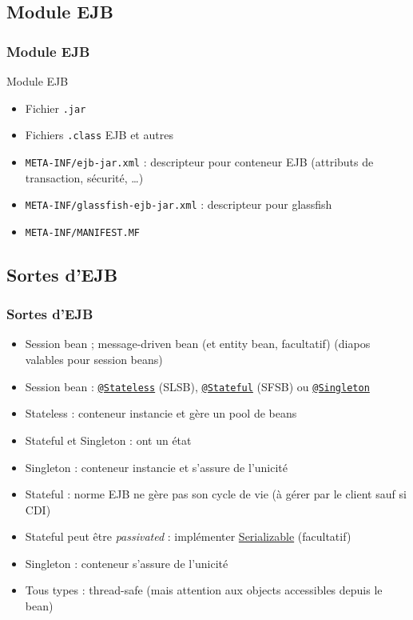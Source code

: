 \documentclass[english, french]{beamer}
\begin{document}
\subsection{Module EJB}
\begin{frame}
	\frametitle{Module EJB}
	\begin{block}{Module EJB}
		\begin{itemize}
			\item Fichier \texttt{.jar}
			\item Fichiers \texttt{.class} EJB et autres
			\item \texttt{META-INF/ejb-jar.xml} : descripteur pour conteneur EJB (attributs de transaction, sécurité, …)
			\item \texttt{META-INF/glassfish-ejb-jar.xml} : descripteur pour glassfish
			\item \texttt{META-INF/MANIFEST.MF}
		\end{itemize}
	\end{block}
\end{frame}

\subsection{Sortes d’EJB}
\begin{frame}
	\frametitle{Sortes d’EJB}
	\begin{itemize}
		\item Session bean ; message-driven bean {\tiny (et entity bean, facultatif)} {\tiny (diapos valables pour session beans)}
		\item Session bean : \href{http://docs.oracle.com/javaee/7/api/javax/ejb/Stateless.html}{\texttt{@Stateless}} (SLSB), \href{http://docs.oracle.com/javaee/7/api/javax/ejb/Stateful.html}{\texttt{@Stateful}} (SFSB) ou \href{http://docs.oracle.com/javaee/7/api/javax/ejb/Singleton.html}{\texttt{@Singleton}}
		\item Stateless : conteneur instancie et gère un pool de beans
		\item Stateful et Singleton : ont un état
		\item Singleton : conteneur instancie et s’assure de l’unicité
		\item Stateful : norme EJB ne gère pas son cycle de vie (à gérer par le client {\tiny sauf si CDI})
		\item Stateful peut être \emph{passivated} : implémenter \href{https://docs.oracle.com/javase/8/docs/api/java/io/Serializable.html}{Serializable} {\tiny (facultatif)}
		\item Singleton : conteneur s’assure de l’unicité
		\item Tous types : thread-safe {\tiny (mais attention aux objects accessibles depuis le bean)}
	\end{itemize}
\end{frame}
\end{document}
